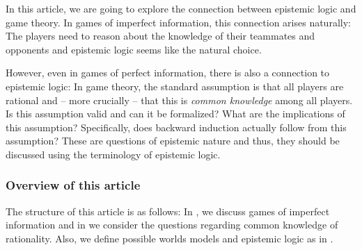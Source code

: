 In this article, we are going to explore the connection between epistemic logic and game theory. In games of imperfect information, this connection arises naturally: The players need to reason about the knowledge of their teammates and opponents and epistemic logic seems like the natural choice.

However, even in games of perfect information, there is also a connection to epistemic logic: In game theory, the standard assumption is that all players are rational and -- more crucially -- that this is \emph{common knowledge} among all players. Is this assumption valid and can it be formalized? What are the implications of this assumption? Specifically, does backward induction actually follow from this assumption? These are questions of epistemic nature and thus, they should be discussed using the terminology of epistemic logic.

\subsubsection*{Overview of this article}

The structure of this article is as follows: In , we discuss games of imperfect information and in  we consider the questions regarding common knowledge of rationality. Also, we define possible worlds models and epistemic logic as in \cite{fagin1995a}.
